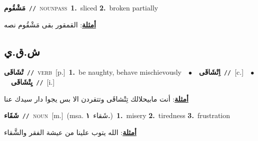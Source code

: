\documentclass[10pt,a4paper,twoside]{article} %
\begin{document}
\begin{multicols}{2}
{\setlength\topsep{0pt}\textbf{\foreignlanguage{arabic}{مَشْقُوم}}\ {\color{gray}\texttt{//}\color{black}}\ \textsc{noun\textunderscore pass}\ \textbf{1.}~sliced  \textbf{2.}~broken partially\  \begin{flushright}\color{gray}\foreignlanguage{arabic}{\textbf{\underline{\foreignlanguage{arabic}{أمثلة}}}: القمقور بقى مَشْقُوم نصه}\end{flushright}\color{black}} \vspace{2mm}

\vspace{-3mm}
\subsection*{\color{blue}\foreignlanguage{arabic}{ش.ق.ي}\color{blue}{}} 

{\setlength\topsep{0pt}\textbf{\foreignlanguage{arabic}{تْشَاقَى}}\ {\color{gray}\texttt{//}\color{black}}\ \textsc{verb}\ [p.]\ \textbf{1.}~be naughty, behave mischievously\ \ $\bullet$\ \ \setlength\topsep{0pt}\textbf{\foreignlanguage{arabic}{اِتْشَاقَى}}\ {\color{gray}\texttt{//}\color{black}}\ [c.]\ \ $\bullet$\ \ \setlength\topsep{0pt}\textbf{\foreignlanguage{arabic}{يِتْشَاقَى}}\ {\color{gray}\texttt{//}\color{black}}\ [i.]\  \begin{flushright}\color{gray}\foreignlanguage{arabic}{\textbf{\underline{\foreignlanguage{arabic}{أمثلة}}}: أنت مابيحلالك تِتْشاقَى وتتقردن الا بس يجوا دار سيدك عنا}\end{flushright}\color{black}} \vspace{2mm}

{\setlength\topsep{0pt}\textbf{\foreignlanguage{arabic}{شَقَاء}}\ {\color{gray}\texttt{//}\color{black}}\ \textsc{noun}\ [m.]\ \color{gray}(msa. \foreignlanguage{arabic}{شَقاء}~\foreignlanguage{arabic}{\textbf{١.}})\color{black}\ \textbf{1.}~misery  \textbf{2.}~tiredness  \textbf{3.}~frustration\  \begin{flushright}\color{gray}\foreignlanguage{arabic}{\textbf{\underline{\foreignlanguage{arabic}{أمثلة}}}: الله يتوب علينا من عيشة الفقر والشَّقاء}\end{flushright}\color{black}} \vspace{2mm}


\end{multicols}
\end{document}
